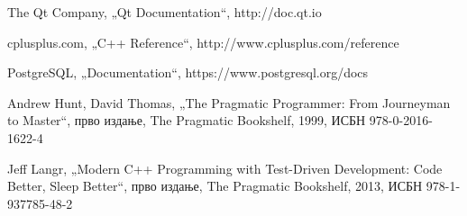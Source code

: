 \documentclass[a4paper, 12pt, diplomski]{etfcyr}
\def\quote#1{„#1“}
\begin{document}
	\begin{thebibliography}{9}
		The Qt Company, \quote{Qt Documentation},
		http://doc.qt.io

		cplusplus.com, \quote{C++ Reference},
		http://www.cplusplus.com/reference

		PostgreSQL, \quote{Documentation},
		https://www.postgresql.org/docs

		Andrew Hunt, David Thomas, \quote{The Pragmatic Programmer: From Journeyman to Master},
		прво издање, The Pragmatic Bookshelf, 1999, ИСБН 978-0-2016-1622-4
		
		Jeff Langr, \quote{Modern C++ Programming with Test-Driven Development: Code Better, Sleep Better},
		прво издање, The Pragmatic Bookshelf, 2013, ИСБН 978-1-937785-48-2
	\end{thebibliography}
\end{document}

